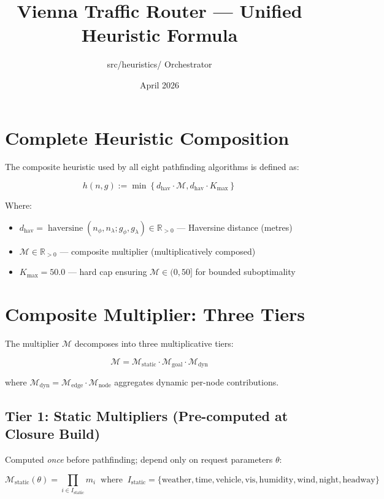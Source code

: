 \documentclass[12pt,a4paper]{article}
\title{\textbf{Vienna Traffic Router — Unified Heuristic Formula}}
\author{src/heuristics/ Orchestrator}
\date{April 2026}
\DeclareMathOperator{\haversine}{haversine}
\newcommand{\M}{\mathcal{M}}
\newcommand{\Kmax}{K_{\max}}
\newcommand{\dhat}{d_{\text{hav}}}
\begin{document}
\maketitle

\section*{Complete Heuristic Composition}

The composite heuristic used by all eight pathfinding algorithms is defined as:

\[
h(n, g) := \min\left\{ \dhat \cdot \M, \dhat \cdot \Kmax \right\}
\]

Where:
\begin{itemize}
  \item $\dhat = \haversine(n_\phi, n_\lambda; g_\phi, g_\lambda) \in \mathbb{R}_{>0}$ — Haversine distance (metres)
  \item $\M \in \mathbb{R}_{>0}$ — composite multiplier (multiplicatively composed)
  \item $\Kmax = 50.0$ — hard cap ensuring $\M \in (0, 50]$ for bounded suboptimality
\end{itemize}

\section*{Composite Multiplier: Three Tiers}

The multiplier $\M$ decomposes into three multiplicative tiers:

\[
\M = \M_{\text{static}} \cdot \M_{\text{goal}} \cdot \M_{\text{dyn}}
\]

where $\M_{\text{dyn}} = \M_{\text{edge}} \cdot \M_{\text{node}}$ aggregates dynamic per-node contributions.

\subsection*{Tier 1: Static Multipliers (Pre-computed at Closure Build)}

Computed \textit{once} before pathfinding; depend only on request parameters $\theta$:

\[
\M_{\text{static}}(\theta) = \prod_{i \in I_{\text{static}}} m_i \;\; \text{where} \;\; I_{\text{static}} = \{\text{weather}, \text{time}, \text{vehicle}, \text{vis}, \text{humidity}, \text{wind}, \text{night}, \text{headway}\}
\]
\end{document}
